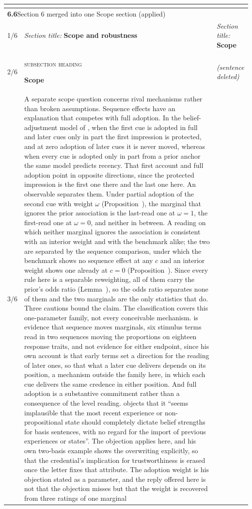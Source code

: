 \documentclass[10pt]{article}
\theoremstyle{definition}
\renewcommand{\ref}[1]{\textsc{\detokenize{#1}}}
\newcommand{\entryhead}[2]{\multicolumn{3}{|l|}{\rule{0pt}{2.6ex}\large\textbf{#1}\quad #2} \\ \hline}
\begin{document}
{\begin{longtable}{|p{0.9cm}|p{12.2cm}|p{12.2cm}|}
\multicolumn{3}{|l|}{} \\ \hline
\entryhead{6.6}{Section 6 merged into one Scope section (applied)\quad{\footnotesize\textit{(formerly C.22)}}}
1/6 & \textit{Section title:} \textbf{Scope and robustness} & \textit{Section title:} \textbf{Scope} \\ \hline
2/6 & \textsc{subsection heading}\par\textbf{\large Scope}\par  & \textit{(sentence deleted)} \\ \hline
3/6 & A separate scope question concerns rival mechanisms rather than broken assumptions. Sequence effects have an explanation that competes with full adoption. In the belief-adjustment model of \citet{HogarthEinhorn1992}, when the first cue is adopted in full and later cues only in part the first impression is protected, and at zero adoption of later cues it is never moved, whereas when every cue is adopted only in part from a prior anchor the same model predicts recency. That first account and full adoption point in opposite directions, since the protected impression is the first one there and the last one here. An observable separates them. Under partial adoption of the second cue with weight $\omega$ (Proposition~\ref{prop:ADJ}), the marginal that ignores the prior association is the last-read one at $\omega=1$, the first-read one at $\omega=0$, and neither in between. A reading on which neither marginal ignores the association is consistent with an interior weight and with the benchmark alike; the two are separated by the sequence comparison, under which the benchmark shows no sequence effect at any $c$ and an interior weight shows one already at $c=0$ (Proposition~\ref{prop:ADJ}). Since every rule here is a separable reweighting, all of them carry the prior's odds ratio (Lemma~\ref{lem:SEP}), so the odds ratio separates none of them and the two marginals are the only statistics that do. Three cautions bound the claim. The classification covers this one-parameter family, not every conceivable mechanism. \citet{Asch1946} is evidence that sequence moves marginals, six stimulus terms read in two sequences moving the proportions on eighteen response traits, and not evidence for either endpoint, since his own account is that early terms set a direction for the reading of later ones, so that what a later cue delivers depends on its position, a mechanism outside the family here, in which each cue delivers the same credence in either position. And full adoption is a substantive commitment rather than a consequence of the level reading. \citet{Hawthorne2004} objects that it ``seems implausible that the most recent experience or non-propositional state should completely dictate belief strengths for basis sentences, with no regard for the import of previous experiences or states''. The objection applies here, and his own two-basis example shows the overwriting explicitly, so that the credential's implication for trustworthiness is erased once the letter fixes that attribute. The adoption weight is his objection stated as a parameter, and the reply offered here is not that the objection misses but that the weight is recovered from three ratings of one marginal 
\end{longtable}}
\end{document}
